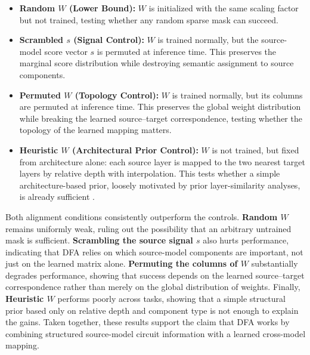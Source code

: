 \documentclass{article} %
\begin{document}
\begin{itemize}[leftmargin=*,nosep]
    \item \textbf{Random $W$ (Lower Bound):} $W$ is initialized with the same scaling factor but not trained, testing whether any random sparse mask can succeed.
    
    \item \textbf{Scrambled $s$ (Signal Control):} $W$ is trained normally, but the source-model score vector $s$ is permuted at inference time. This preserves the marginal score distribution while destroying semantic assignment to source components.
    
    
    \item \textbf{Permuted $W$ (Topology Control):} $W$ is trained normally, but its columns are permuted at inference time. This preserves the global weight distribution while breaking the learned source--target correspondence, testing whether the topology of the learned mapping matters.

   

    \item \textbf{Heuristic $W$ (Architectural Prior Control):} $W$ is not trained, but fixed from architecture alone: each source layer is mapped to the two nearest target layers by relative depth with interpolation. This tests whether a simple architecture-based prior, loosely motivated by prior layer-similarity analyses, is already sufficient \citep{wu-etal-2020-similarity, pmlr-v97-kornblith19a}.
\end{itemize}





Both alignment conditions consistently outperform the controls. \textbf{Random $W$} remains uniformly weak, ruling out the possibility that an arbitrary untrained mask is sufficient. \textbf{Scrambling the source signal $s$} also hurts performance, indicating that DFA relies on which source-model components are important, not just on the learned matrix alone. \textbf{Permuting the columns of $W$} substantially degrades performance, showing that success depends on the learned source--target correspondence rather than merely on the global distribution of weights. Finally, \textbf{Heuristic $W$} performs poorly across tasks, showing that a simple structural prior based only on relative depth and component type is not enough to explain the gains. Taken together, these results support the claim that DFA works by combining structured source-model circuit information with a learned cross-model mapping. 
\end{document}
